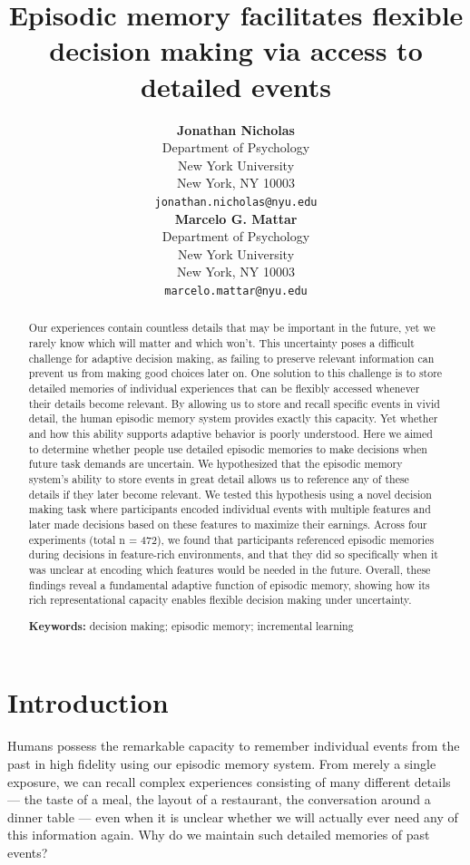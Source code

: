 \documentclass[10pt,letterpaper]{article}
\title{Episodic memory facilitates flexible decision making via access to detailed events}
\author{
{\large \bf Jonathan Nicholas} \\
Department of Psychology \\
New York University \\
New York, NY 10003 \\
\texttt{jonathan.nicholas@nyu.edu} \\
\And
{\large \bf Marcelo G. Mattar} \\
Department of Psychology \\
New York University \\
New York, NY 10003 \\
\texttt{marcelo.mattar@nyu.edu}
}
\begin{document}
\maketitle

\begin{abstract}

Our experiences contain countless details that may be important in the future, yet we rarely know which will matter and which won't. This uncertainty poses a difficult challenge for adaptive decision making, as failing to preserve relevant information can prevent us from making good choices later on. One solution to this challenge is to store detailed memories of individual experiences that can be flexibly accessed whenever their details become relevant. By allowing us to store and recall specific events in vivid detail, the human episodic memory system provides exactly this capacity. Yet whether and how this ability supports adaptive behavior is poorly understood. Here we aimed to determine whether people use detailed episodic memories to make decisions when future task demands are uncertain. We hypothesized that the episodic memory system's ability to store events in great detail allows us to reference any of these details if they later become relevant. We tested this hypothesis using a novel decision making task where participants encoded individual events with multiple features and later made decisions based on these features to maximize their earnings. Across four experiments (total n = 472), we found that participants referenced episodic memories during decisions in feature-rich environments, and that they did so specifically when it was unclear at encoding which features would be needed in the future. Overall, these findings reveal a fundamental adaptive function of episodic memory, showing how its rich representational capacity enables flexible decision making under uncertainty.

\textbf{Keywords:} 
decision making; episodic memory; incremental learning

\end{abstract}

\section{Introduction}

Humans possess the remarkable capacity to remember individual events from the past in high fidelity using our episodic memory system\cite{tulvingEpisodicSemanticMemory1972, eichenbaumHippocampusMechanismsDeclarative1999}. From merely a single exposure, we can recall complex experiences consisting of many different details --- the taste of a meal, the layout of a restaurant, the conversation around a dinner table --- even when it is unclear whether we will actually ever need any of this information again. Why do we maintain such detailed memories of past events?
\end{document}
